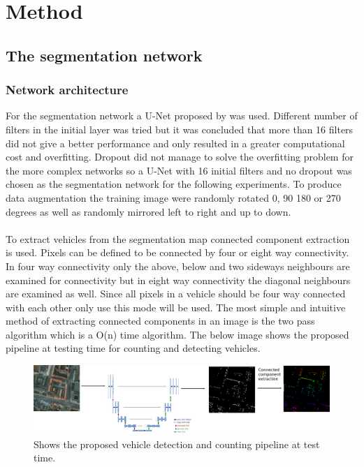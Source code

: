 \documentclass{kththesis}
\begin{document}
\chapter{Method}
\section{The segmentation network}
\subsection{Network architecture}
For the segmentation network a U-Net proposed by \parencite{ronneberger_u-net:_2015} was used. Different number of filters in the initial layer was tried but it was concluded that more than 16 filters did not give a better performance and only resulted in a greater computational cost and overfitting. Dropout did not manage to solve the overfitting problem for the more complex networks so a U-Net with 16 initial filters and no dropout was chosen as the segmentation network for the following experiments. To produce data augmentation the training image were randomly rotated 0, 90 180 or 270 degrees as well as randomly mirrored left to right and up to down.\\
\\
To extract vehicles from the segmentation map connected component extraction is used. Pixels can be defined to be connected by four or eight way connectivity. In four way connectivity only the above, below and two sideways neighbours are examined for connectivity but in eight way connectivity the diagonal neighbours are examined as well. Since all pixels in a vehicle should be four way connected with each other only use this mode will be used. The most simple and intuitive method of extracting connected components in an image is the two pass algorithm \parencite{stockman_computer_2001} which is a O(n) time algorithm. The below image shows the proposed pipeline at testing time for counting and detecting vehicles.
\begin{figure}[H]
  \centering
      \includegraphics[scale=.15]{net}
  \caption{Shows the proposed vehicle detection and counting pipeline at test time.} \label{fig:pipe}
\end{figure}
\end{document}
